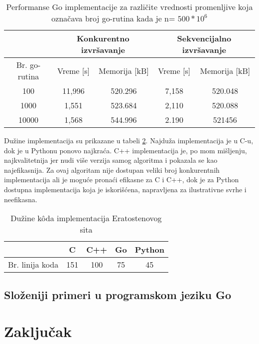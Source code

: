 \documentclass[12pt,oneside]{memoir}
\begin{document}
\begin{table}
\begin{center}
\caption{Performanse Go implementacije za različite vrednosti promenljive koja označava broj go-rutina kada je n= $500*10^{6}$}
\begin{tabular}{||c||c|c||c|c||}
\hline
&\multicolumn{2}{c||}{Konkurentno izvršavanje}&\multicolumn{2}{c||}{Sekvencijalno izvršavanje} \\ \hline
Br. go-rutina	& Vreme [s]& Memorija [kB]& Vreme [s]& Memorija [kB]\\ \hline
100		& 11,996	& 520.296	&7,158	&520.048\\ \hline
1000		& 1,551	& 523.684	&2,110 	&520.088\\ \hline
10000		& 1,568	& 544.996	&2.190	&521456\\ \hline
\end{tabular}
\label{tab:prime3}
\end{center}
\end{table}

Dužine implementacija su prikazane u tabeli \ref{tab:prime4}. Najduža implementacija je u C-u, dok je u Pythonu ponovo najkraća. C++ implementacija je, po mom mišljenju, najkvalitetnija jer nudi više verzija samog algoritma i pokazala se kao najefikasnija. Za ovaj algoritam nije dostupan veliki broj konkurentnih implementacija ali je moguće pronaći efikasne za C i C++, dok je za Python dostupna implementacija koja je iskorišćena, napravljena za ilustrativne svrhe i neefikasna.

\begin{table}
\begin{center}
\caption{Dužine k\^{o}da implementacija Eratostenovog sita}
\begin{tabular}{|c|c|c|c|c|}
\hline
		&  C  		&C++ 	& Go 	& Python 	 \\ \hline
Br. linija koda& 151		& 100		&75	&45		 \\ \hline
\end{tabular}
\label{tab:prime4}
\end{center}
\end{table}


\section{Složeniji primeri u programskom jeziku Go}




\chapter{Zaključak}





\printbibliography 
\backmatter
\end{document}
